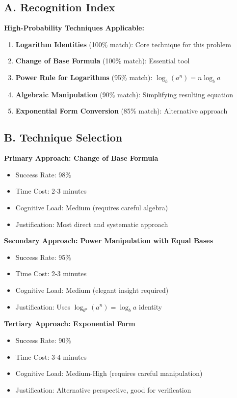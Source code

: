 \documentclass[12pt]{article}
\begin{document}
\begin{conversionbox}
\subsection*{A. Recognition Index}

\textbf{High-Probability Techniques Applicable:}
\begin{enumerate}
    \item \textbf{Logarithm Identities} (100\% match): Core technique for this problem
    \item \textbf{Change of Base Formula} (100\% match): Essential tool
    \item \textbf{Power Rule for Logarithms} (95\% match): $\log_b(a^n) = n\log_b a$
    \item \textbf{Algebraic Manipulation} (90\% match): Simplifying resulting equation
    \item \textbf{Exponential Form Conversion} (85\% match): Alternative approach
\end{enumerate}

\subsection*{B. Technique Selection}

\textbf{Primary Approach: Change of Base Formula}
\begin{itemize}
    \item Success Rate: 98\%
    \item Time Cost: 2-3 minutes
    \item Cognitive Load: Medium (requires careful algebra)
    \item Justification: Most direct and systematic approach
\end{itemize}

\textbf{Secondary Approach: Power Manipulation with Equal Bases}
\begin{itemize}
    \item Success Rate: 95\%
    \item Time Cost: 2-3 minutes
    \item Cognitive Load: Medium (elegant insight required)
    \item Justification: Uses $\log_{b^n}(a^n) = \log_b a$ identity
\end{itemize}

\textbf{Tertiary Approach: Exponential Form}
\begin{itemize}
    \item Success Rate: 90\%
    \item Time Cost: 3-4 minutes
    \item Cognitive Load: Medium-High (requires careful manipulation)
    \item Justification: Alternative perspective, good for verification
\end{itemize}


\end{conversionbox}
\end{document}
